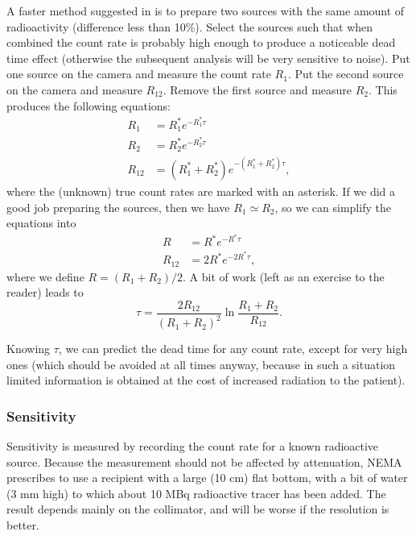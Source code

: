 \documentclass[11pt,oneside]{book}
\begin{document}
A faster method suggested in \cite{Aanbevelingen} is to prepare two sources
with the same amount of radioactivity (difference less than 10\%). Select the
sources such that when combined the count rate is probably high enough to
produce a noticeable dead time effect (otherwise the subsequent analysis will
be very sensitive to noise). Put one source on the camera and measure the
count rate $R_1$. Put the second source on the camera and measure $R_{12}$.
Remove the first source and measure $R_2$. This produces the following
equations:
\begin{align}
    R_1    &= R^\ast_1 e^{-R^\ast_1 \tau}\\
    R_2    &= R^\ast_2 e^{-R^\ast_2 \tau}\\
    R_{12} &= (R^\ast_1 + R^\ast_2) e^{-(R^\ast_1 + R^\ast_2) \tau},
\end{align}
where the (unknown) true count rates are marked with an asterisk. If we did a
good job preparing the sources, then we have $R_1 \simeq R_2$, so we can
simplify the equations into
\begin{align}
  R       &= R^\ast e^{- R^\ast \tau}\\
  R_{12}  &= 2 R^\ast e^{- 2 R^\ast \tau},
\end{align}
where we define $R = (R_1 + R_2) / 2$. A bit of work (left as an exercise
to the reader) leads to
\begin{equation}
  \tau = \frac{2 R_{12}}{(R_1 + R_2)^2} \ln \frac{R_1 + R_2}{R_{12}}.
\end{equation}

Knowing $\tau$, we can predict the dead time for any count rate, except for
very high ones (which should be avoided at all times anyway, because
in such a situation limited information is obtained at the cost of
increased radiation to the patient).

\subsubsection{Sensitivity}
Sensitivity is measured by recording the count rate for a known radioactive
source. Because the measurement should not be affected by attenuation, NEMA
prescribes to use a recipient with a large (10 cm) flat bottom, with a bit of
water (3 mm high) to which about 10 MBq radioactive tracer has been added. The
result depends mainly on the collimator, and will be worse if the resolution
is better.
\end{document}
